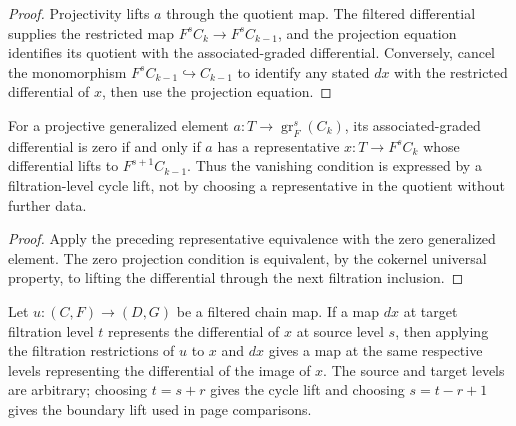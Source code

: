 \begin{proof}
  \leanok
  Projectivity lifts $a$ through the quotient map.  The filtered differential
  supplies the restricted map $F^sC_k\to F^sC_{k-1}$, and the projection
  equation identifies its quotient with the associated-graded differential.
  Conversely, cancel the monomorphism $F^sC_{k-1}\hookrightarrow C_{k-1}$
  to identify any stated $dx$ with the restricted differential of $x$, then
  use the projection equation.
\end{proof}

\begin{theorem}
  \label{thm:filtered-associated-graded-cycle-representative}
  \leanok
  For a projective generalized element $a:T\to\operatorname{gr}^s_F(C_k)$,
  its associated-graded differential is zero if and only if $a$ has a
  representative $x:T\to F^sC_k$ whose differential lifts to
  $F^{s+1}C_{k-1}$.  Thus the vanishing condition is expressed by a
  filtration-level cycle lift, not by choosing a representative in the
  quotient without further data.
\end{theorem}

\begin{proof}
  \leanok
  Apply the preceding representative equivalence with the zero generalized
  element.  The zero projection condition is equivalent, by the cokernel
  universal property, to lifting the differential through the next filtration
  inclusion.
\end{proof}

\begin{theorem}
  \label{thm:filtered-differential-representative-naturality}
  \leanok
  Let $u:(C,F)\to(D,G)$ be a filtered chain map.  If a map $dx$ at target
  filtration level $t$ represents the differential of $x$ at source level
  $s$, then applying the filtration restrictions of $u$ to $x$ and $dx$
  gives a map at the same respective levels representing the differential of
  the image of $x$.  The source and target levels are arbitrary; choosing
  $t=s+r$ gives the cycle lift and choosing $s=t-r+1$ gives the boundary lift
  used in page comparisons.
\end{theorem}

